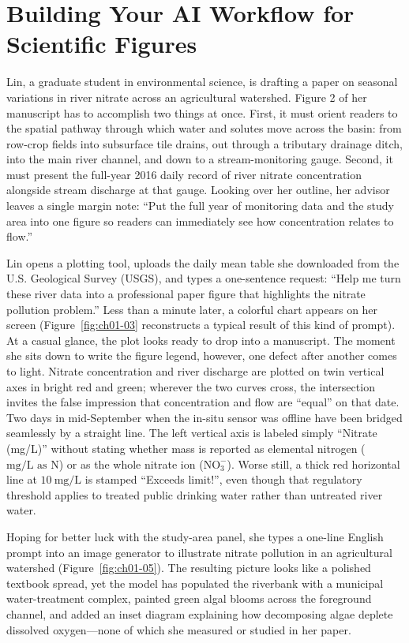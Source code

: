 \chapter{Building Your AI Workflow for Scientific Figures}
\usetikzlibrary{decorations.pathreplacing}

Lin, a graduate student in environmental science, is drafting a paper on seasonal variations in river nitrate across an agricultural watershed. Figure 2 of her manuscript has to accomplish two things at once. First, it must orient readers to the spatial pathway through which water and solutes move across the basin: from row-crop fields into subsurface tile drains, out through a tributary drainage ditch, into the main river channel, and down to a stream-monitoring gauge. Second, it must present the full-year 2016 daily record of river nitrate concentration alongside stream discharge at that gauge. Looking over her outline, her advisor leaves a single margin note: ``Put the full year of monitoring data and the study area into one figure so readers can immediately see how concentration relates to flow.''

Lin opens a plotting tool, uploads the daily mean table she downloaded from the U.S. Geological Survey (USGS), and types a one-sentence request: ``Help me turn these river data into a professional paper figure that highlights the nitrate pollution problem.'' Less than a minute later, a colorful chart appears on her screen (Figure~\ref{fig:ch01-03} reconstructs a typical result of this kind of prompt). At a casual glance, the plot looks ready to drop into a manuscript. The moment she sits down to write the figure legend, however, one defect after another comes to light. Nitrate concentration and river discharge are plotted on twin vertical axes in bright red and green; wherever the two curves cross, the intersection invites the false impression that concentration and flow are ``equal'' on that date. Two days in mid-September when the in-situ sensor was offline have been bridged seamlessly by a straight line. The left vertical axis is labeled simply ``Nitrate (mg/L)'' without stating whether mass is reported as elemental nitrogen ($\text{mg/L as N}$) or as the whole nitrate ion ($\text{NO}_3^-$). Worse still, a thick red horizontal line at $10\ \text{mg/L}$ is stamped ``Exceeds limit!'', even though that regulatory threshold applies to treated public drinking water rather than untreated river water.

Hoping for better luck with the study-area panel, she types a one-line English prompt into an image generator to illustrate nitrate pollution in an agricultural watershed (Figure~\ref{fig:ch01-05}). The resulting picture looks like a polished textbook spread, yet the model has populated the riverbank with a municipal water-treatment complex, painted green algal blooms across the foreground channel, and added an inset diagram explaining how decomposing algae deplete dissolved oxygen---none of which she measured or studied in her paper.

